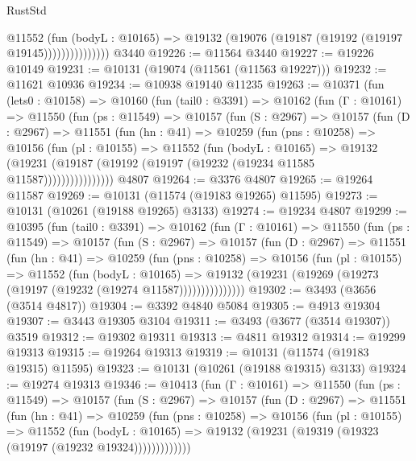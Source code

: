 \begin{lexlean}{RustStd}
\begin{coremodule}
                      @11552
                        (fun (bodyL : @10165) =>
                        @19132 (@19076 (@19187 (@19192 (@19197 @19145)))))))))))))))
    @3440
@19226 := @11564 @3440
@19227 := @19226 @10149
@19231 := @10131 (@19074 (@11561 (@11563 @19227)))
@19232 := @11621 @10936
@19234 := @10938 @19140 @11235
@19263 := @10371
    (fun (lets0 : @10158) =>
    @10160
      (fun (tail0 : @3391) =>
      @10162
        (fun (Γ : @10161) =>
        @11550
          (fun (ps : @11549) =>
          @10157
            (fun (S : @2967) =>
            @10157
              (fun (D : @2967) =>
              @11551
                (fun (hn : @41) =>
                @10259
                  (fun (pns : @10258) =>
                  @10156
                    (fun (pl : @10155) =>
                    @11552
                      (fun (bodyL : @10165) =>
                      @19132
                        (@19231
                          (@19187 (@19192 (@19197 (@19232 (@19234 @11585 @11587))))))))))))))))
    @4807
@19264 := @3376 @4807
@19265 := @19264 @11587
@19269 := @10131 (@11574 (@19183 @19265) @11595)
@19273 := @10131 (@10261 (@19188 @19265) @3133)
@19274 := @19234 @4807
@19299 := @10395
    (fun (tail0 : @3391) =>
    @10162
      (fun (Γ : @10161) =>
      @11550
        (fun (ps : @11549) =>
        @10157
          (fun (S : @2967) =>
          @10157
            (fun (D : @2967) =>
            @11551
              (fun (hn : @41) =>
              @10259
                (fun (pns : @10258) =>
                @10156
                  (fun (pl : @10155) =>
                  @11552
                    (fun (bodyL : @10165) =>
                    @19132 (@19231 (@19269 (@19273 (@19197 (@19232 (@19274 @11587)))))))))))))))
@19302 := @3493 (@3656 (@3514 @4817))
@19304 := @3392 @4840 @5084
@19305 := @4913 @19304
@19307 := @3443 @19305 @3104
@19311 := @3493 (@3677 (@3514 @19307)) @3519
@19312 := @19302 @19311
@19313 := @4811 @19312
@19314 := @19299 @19313
@19315 := @19264 @19313
@19319 := @10131 (@11574 (@19183 @19315) @11595)
@19323 := @10131 (@10261 (@19188 @19315) @3133)
@19324 := @19274 @19313
@19346 := @10413
    (fun (Γ : @10161) =>
    @11550
      (fun (ps : @11549) =>
      @10157
        (fun (S : @2967) =>
        @10157
          (fun (D : @2967) =>
          @11551
            (fun (hn : @41) =>
            @10259
              (fun (pns : @10258) =>
              @10156
                (fun (pl : @10155) =>
                @11552
                  (fun (bodyL : @10165) =>
                  @19132 (@19231 (@19319 (@19323 (@19197 (@19232 @19324)))))))))))))

\end{coremodule}
\end{lexlean}
